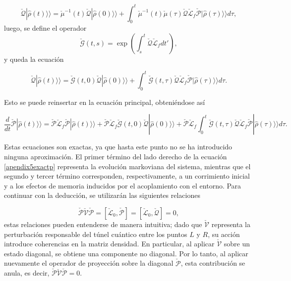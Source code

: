 \begin{appendixs}
\begin{equation*}
    \check{\mathcal{Q}}|\hat{\rho}(t)\rangle \rangle  = \check{\mu}^{-1}(t)\check{\mathcal{Q}}|\hat{\rho}(0)\rangle \rangle  + \int_{0}^{t}\check{\mu}^{-1}(t)\check{\mu}(\tau)\check{\mathcal{Q}}\check{\mathcal{L}}_{f} \check{\mathcal{P}}|\hat{\rho}(\tau)\rangle \rangle d\tau,    
\end{equation*}
luego, se define el operador 
\begin{equation*}
    \check{\mathcal{G}}(t,s) = \exp\left(  \int_{s}^{t}\check{\mathcal{Q}}\check{\mathcal{L}}_{f}dt' \right),
\end{equation*}
y queda la ecuación 

\begin{equation*}
    \check{\mathcal{Q}}|\hat{\rho}(t)\rangle \rangle = \check{\mathcal{G}}(t,0)\check{\mathcal{Q}}|\hat{\rho}(0)\rangle \rangle  + \int_{0}^{t}\check{\mathcal{G}}(t,\tau)\check{\mathcal{Q}}\check{\mathcal{L}}_{f} \check{\mathcal{P}}|\hat{\rho}(\tau)\rangle \rangle d\tau.    
\end{equation*}

Esto se puede reinsertar en la ecuación principal, obteniéndose así

\begin{equation}
    \frac{d}{dt}\check{\mathcal{P}}|\hat{\rho}(t)\rangle \rangle  = \check{\mathcal{P}}\check{\mathcal{L}}_{f}\check{\mathcal{P}}|\hat{\rho}(t)\rangle \rangle  + \check{\mathcal{P}}\check{\mathcal{L}}_{f}\check{\mathcal{G}}(t,0)\check{\mathcal{Q}}|\hat{\rho}(0)\rangle \rangle  + \check{\mathcal{P}}\check{\mathcal{L}}_{f}\int_{0}^{t}\check{\mathcal{G}}(t,\tau)\check{\mathcal{Q}}\check{\mathcal{L}}_{f} \check{\mathcal{P}}|\hat{\rho}(\tau)\rangle \rangle d\tau.    
    \label{apendix5exactp}
\end{equation}

Estas ecuaciones son exactas, ya que hasta este punto no se ha introducido ninguna aproximación. El primer término del lado derecho de la ecuación \ref{apendix5exactp} representa la evolución markoviana del sistema, mientras que el segundo y tercer término corresponden, respectivamente, a un corrimiento inicial y a los efectos de memoria inducidos por el acoplamiento con el entorno. Para continuar con la deducción, se utilizarán las siguientes relaciones

\begin{equation*}
    \check{\mathcal{P}}\check{\mathcal{V}}\check{\mathcal{P}} = [\check{\mathcal{L}}_0,\check{\mathcal{P}}] = [\check{\mathcal{L}}_0,\check{\mathcal{Q}}] = 0, 
\end{equation*}
estas relaciones pueden entenderse de manera intuitiva; dado que $\check{\mathcal{V}}$ representa la perturbación responsable del túnel cuántico entre los puntos $L$ y $R$, su acción introduce coherencias en la matriz densidad. En particular, al aplicar $\check{\mathcal{V}}$ sobre un estado diagonal, se obtiene una componente no diagonal. Por lo tanto, al aplicar nuevamente el operador de proyección sobre la diagonal $\check{\mathcal{P}}$, esta contribución se anula, es decir, $\check{\mathcal{P}} \check{\mathcal{V}} \check{\mathcal{P}} = 0$.


\end{appendixs}
